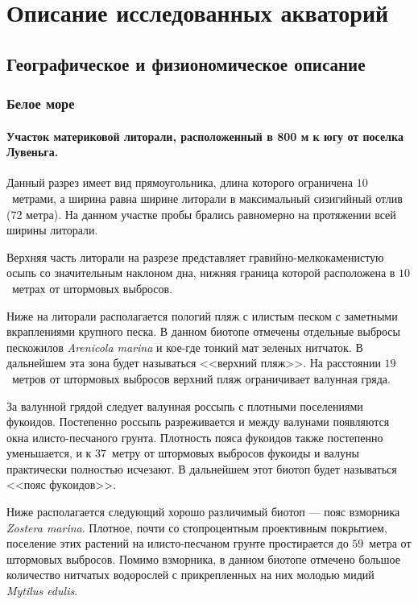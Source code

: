     \chapter{Описание исследованных акваторий}
        \section{Географическое и физиономическое описание}
			\subsection{Белое море}

\subsubsection{Участок материковой литорали, расположенный в 800 м к югу от поселка Лувеньга.}

Данный разрез имеет вид прямоугольника, длина которого ограничена $10$~метрами, а ширина равна ширине литорали в максимальный сизигийный отлив (72 метра). 
На данном участке пробы брались равномерно на протяжении всей ширины литорали. 

Верхняя часть литорали на разрезе представляет гравийно-мелкокаменистую осыпь со значительным наклоном дна, нижняя граница которой расположена в 
$10$~метрах от штормовых выбросов.

Ниже на литорали располагается пологий пляж с илистым песком с заметными вкраплениями крупного песка. 
В данном биотопе отмечены отдельные выбросы пескожилов {\it Arenicola marina} и кое-где тонкий мат зеленых нитчаток. 
В дальнейшем эта зона будет называться <<верхний пляж>>. 
На расстоянии $19$~метров от штормовых выбросов верхний пляж ограничивает валунная гряда.

За валунной грядой следует валунная россыпь с плотными поселениями фукоидов. 
Постепенно россыпь разреживается и между валунами появляются окна илисто-песчаного грунта. 
Плотность пояса фукоидов также постепенно уменьшается, и к $37$~метру от штормовых выбросов фукоиды и валуны практически полностью исчезают. 
В дальнейшем этот биотоп будет называться <<пояс фукоидов>>.

Ниже располагается следующий хорошо различимый биотоп --- пояс взморника {\it Zostera marina}. 
Плотное, почти со стопроцентным проективным покрытием, поселение этих растений на илисто-песчаном грунте простирается до $59$~метра от штормовых выбросов. 
Помимо взморника, в данном биотопе отмечено большое количество нитчатых водорослей с прикрепленных на них молодью мидий {\it Mytilus edulis}.


